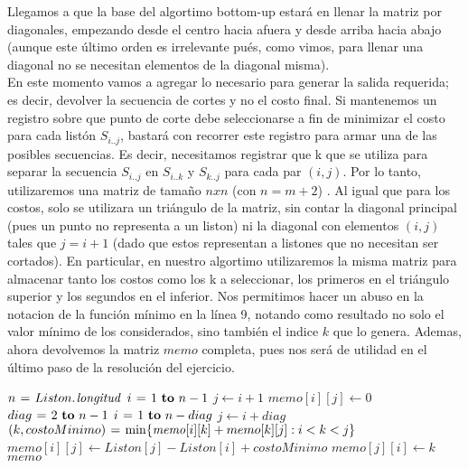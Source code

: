 Llegamos a que la base del algortimo bottom-up estar\'a en llenar la matriz por diagonales, empezando desde el centro hacia afuera 
y desde arriba hacia abajo (aunque este \'ultimo orden es irrelevante pu\'es, como vimos, para llenar una diagonal no se necesitan elementos de la diagonal misma). \\
En este momento vamos a agregar lo necesario para generar la salida requerida; es decir, devolver la secuencia de cortes y no el costo final.
Si mantenemos un registro sobre que punto de corte debe seleccionarse a fin de minimizar el costo para cada list\'on $S_{i..j}$, bastar\'a con recorrer
este registro para armar una de las posibles secuencias. Es decir, necesitamos registrar que k que se utiliza para separar la secuencia $S_{i..j}$ en 
$S_{i..k}$ y $S_{k..j}$ para cada par $(i,j)$. Por lo tanto, utilizaremos una matriz de tama\~no $n x n$ (con $n=m+2$) . Al igual que para los costos, 
solo se utilizara un tri\'angulo de la matriz, sin contar la diagonal principal (pues un punto no representa a un liston) ni la diagonal con elementos $(i,j)$ tales que $j = i +1$ (dado que estos representan a listones que no necesitan ser cortados). En particular, en nuestro algortimo utilizaremos la misma 
matriz para almacenar tanto los costos como los k a seleccionar, los primeros en el tri\'angulo superior y los segundos en el inferior. 
Nos permitimos hacer un abuso en la notacion de la funci\'on m\'inimo en la l\'inea 9, notando como resultado no solo el valor m\'inimo de los considerados, sino tambi\'en el indice $k$ que lo genera. Ademas, ahora devolvemos la matriz $memo$ completa, pues nos ser\'a de utilidad en el \'ultimo paso de la resoluci\'on del ejercicio.   


\begin{algorithm}[H]
	\caption{Version bottom-up de costo minimo} 			
	\begin{codebox}
		\li $n \gets \attrib{Liston}{longitud}$
		\li \For $ i \gets 1 \To n-1 $
						\Do
		\li					$j \gets i+1$
		\li					$memo[i][j] \gets 0$
						\End
		\li
		\li \For $ diag \gets 2 \To n-1$ 
				\Do
		\li			\For $ i \gets 1 \To n-diag$ 
		 				\Do
		\li					$j \gets i + diag$
		\li					$(k, costoMinimo) \gets \min\{\id{memo}[i][k] + memo[k][j]: i < k < j\}$
		\li					$memo[i][j] \gets Liston[j]-Liston[i]+ costoMinimo $
		\li					$memo[j][i] \gets k$
						\End
				\End
		\li	\Return $memo$
		\End
	\end{codebox}
\end{algorithm}

